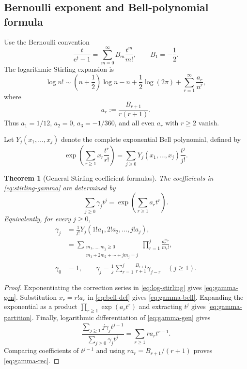 \documentclass[11pt,a4paper]{article}
\newtheorem{theorem}{Theorem}[section]
\theoremstyle{definition}
\theoremstyle{remark}
\newcommand{\e}{\mathrm e}
\begin{document}
\subsection{Bernoulli exponent and Bell-polynomial formula}

Use the Bernoulli convention
\begin{equation}\label{eq:bernoulli}
 \frac{t}{\e^t-1}=\sum_{m=0}^{\infty}B_m\frac{t^m}{m!},
 \qquad B_1=-\frac12.
\end{equation}
The logarithmic Stirling expansion is
\begin{equation}\label{eq:log-stirling}
 \log n!
 \sim\left(n+\frac12\right)\log n-n+\frac12\log(2\pi)
 +\sum_{r=1}^{\infty}\frac{a_r}{n^r},
\end{equation}
where
\begin{equation}\label{eq:ar}
 a_r:=\frac{B_{r+1}}{r(r+1)}.
\end{equation}
Thus \(a_1=1/12\), \(a_2=0\), \(a_3=-1/360\), and all even
\(a_r\) with \(r\ge2\) vanish.

Let \(Y_j(x_1,\ldots,x_j)\) denote the complete exponential Bell polynomial,
defined by
\begin{equation}\label{eq:bell-def}
 \exp\left(\sum_{r\ge1}x_r\frac{t^r}{r!}\right)
 =\sum_{j\ge0}Y_j(x_1,\ldots,x_j)\frac{t^j}{j!}.
\end{equation}

\begin{theorem}[General Stirling coefficient formulas]\label{thm:stirling-coeff}
The coefficients in \eqref{eq:stirling-gamma} are determined by
\begin{equation}\label{eq:gamma-gen}
 \sum_{j\ge0}\gamma_jt^j
 =\exp\left(\sum_{r\ge1}a_rt^r\right).
\end{equation}
Equivalently, for every \(j\ge0\),
\begin{align}
 \gamma_j
 &=\frac1{j!}Y_j(1!a_1,2!a_2,\ldots,j!a_j),
 \label{eq:gamma-bell}\\
 &=\sum_{\substack{m_1,\ldots,m_j\ge0\\
                    m_1+2m_2+\cdots+jm_j=j}}
   \prod_{r=1}^{j}\frac{a_r^{m_r}}{m_r!},
 \label{eq:gamma-partition}\\
 \gamma_0&=1,\qquad
 \gamma_j=\frac1j\sum_{r=1}^{j}
          \frac{B_{r+1}}{r+1}\gamma_{j-r}
          \quad(j\ge1).
 \label{eq:gamma-rec}
\end{align}
\end{theorem}

\begin{proof}
Exponentiating the correction series in \eqref{eq:log-stirling} gives
\eqref{eq:gamma-gen}.  Substitution \(x_r=r!a_r\) in
\eqref{eq:bell-def} gives \eqref{eq:gamma-bell}.  Expanding the exponential as
a product
\(
 \prod_{r\ge1}\exp(a_rt^r)
\)
and extracting \(t^j\) gives \eqref{eq:gamma-partition}.  Finally, logarithmic
differentiation of \eqref{eq:gamma-gen} gives
\[
 \frac{\sum_{j\ge1}j\gamma_jt^{j-1}}
      {\sum_{j\ge0}\gamma_jt^j}
 =\sum_{r\ge1}ra_rt^{r-1}.
\]
Comparing coefficients of \(t^{j-1}\) and using
\(
 ra_r=B_{r+1}/(r+1)
\) proves \eqref{eq:gamma-rec}.
\end{proof}
\end{document}
